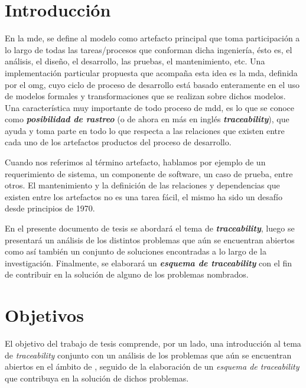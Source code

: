 \documentclass[a4paper,12pt,oneside,spanish]{book}
\begin{document}


\chapter{Introducción}


En la \gls{mde}, se define al modelo como artefacto principal que toma participación a lo largo de todas las tareas/procesos que conforman dicha ingeniería, ésto es, el análisis, el diseño, el desarrollo, las pruebas, el mantenimiento, etc. Una implementación particular propuesta que acompaña esta idea es la \gls{mda}, definida por el \gls{omg}, cuyo ciclo de proceso de desarrollo está basado enteramente en el uso de modelos formales y transformaciones que se realizan sobre dichos modelos. Una característica muy importante de todo proceso de \gls{mdd}, es lo que se conoce como \textit{\textbf{posibilidad de rastreo}} (o de ahora en más en inglés \textit{\textbf{traceability}}), que ayuda y toma parte en todo lo que respecta a las relaciones que existen entre cada uno de los artefactos productos del proceso de desarrollo.

Cuando nos referimos al término artefacto, hablamos por ejemplo de un requerimiento de sistema, un componente de software, un caso de prueba, entre otros. El mantenimiento y la definición de las relaciones y dependencias que existen entre los artefactos no es una tarea fácil, el mismo ha sido un desafío desde principios de 1970.

En el presente documento de tesis se abordará el tema de \textit{\textbf{traceability}}, luego se presentará un análisis de los distintos problemas que aún se encuentran abiertos como así también un conjunto de soluciones encontradas a lo largo de la investigación. Finalmente, se elaborará un \textit{\textbf{esquema de traceability}} con el fin de contribuir en la solución de alguno de los problemas nombrados.




\chapter{Objetivos}


El objetivo del trabajo de tesis comprende, por un lado, una introducción al tema de \textit{traceability} conjunto con un análisis de los problemas que aún se encuentran abiertos en el ámbito de , seguido de la elaboración de un \textit{esquema de traceability} que contribuya en la solución de dichos problemas.
\end{document}
